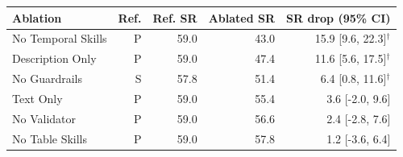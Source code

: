 \begin{tabular}{lrrrr}
\toprule
Ablation & Ref. & Ref. SR & Ablated SR & SR drop (95\% CI) \\
\midrule
No Temporal Skills & P & 59.0 & 43.0 & 15.9 [9.6, 22.3]$^\dagger$ \\
Description Only & P & 59.0 & 47.4 & 11.6 [5.6, 17.5]$^\dagger$ \\
No Guardrails & S & 57.8 & 51.4 & 6.4 [0.8, 11.6]$^\dagger$ \\
Text Only & P & 59.0 & 55.4 & 3.6 [-2.0, 9.6] \\
No Validator & P & 59.0 & 56.6 & 2.4 [-2.8, 7.6] \\
No Table Skills & P & 59.0 & 57.8 & 1.2 [-3.6, 6.4] \\
\bottomrule
\end{tabular}
